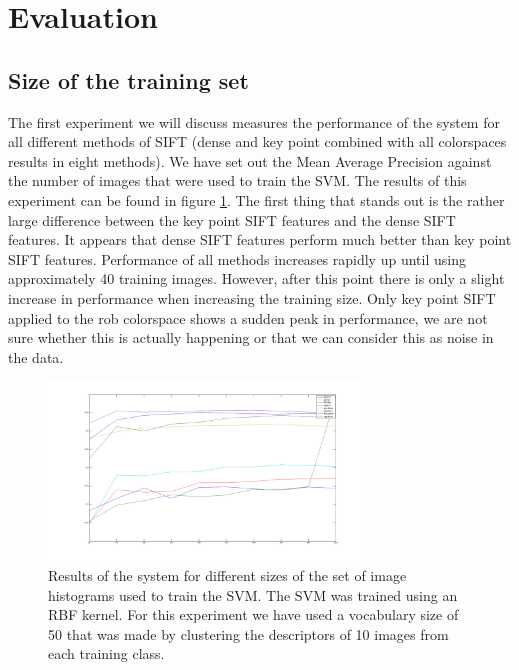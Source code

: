 \documentclass[11pt]{article}
\begin{document}
\section{Evaluation}

\subsection{Size of the training set}
\label{train}
The first experiment we will discuss measures the performance of the system for all different methods of SIFT (dense and key point combined with all colorspaces results in eight methods). We have set out the Mean Average Precision against the number of images that were used to train the SVM. The results of this experiment can be found in figure \ref{trainingSizes}. The first thing that stands out is the rather large difference between the key point SIFT features and the dense SIFT features. It appears that dense SIFT features perform much better than key point SIFT features. Performance of all methods increases rapidly up until using approximately 40 training images. However, after this point there is only a slight increase in performance when increasing the training size. Only key point SIFT applied to the rob colorspace shows a sudden peak in performance, we are not sure whether this is actually happening or that we can consider this as noise in the data. 
\begin{figure}[H]
  \centering
    \includegraphics[width=0.75\textwidth]{trainingSizes}
      \caption{Results of the system for different sizes of the set of image histograms used to train the SVM. The SVM was trained using an RBF kernel. For this experiment we have used a vocabulary size of 50 that was made by clustering the descriptors of 10 images from each training class.}
      \label{trainingSizes}
\end{figure}
\end{document}
